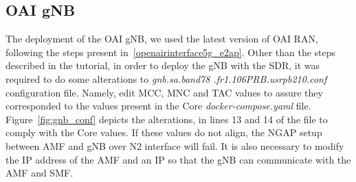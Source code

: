 \begin{table}[H]
    \caption{Deployed 5G Core Network Functions IP addresses.}
    \label{tab:ip_core}
    \centering
\end{table}

\begin{table}[H]
    \caption{Deployed Data Network Components IP addresses.}
    \label{tab:ip_dn}
    \centering
\end{table}





\subsection{OAI gNB}\label{subsec:oai-gnb}
The deployment of the OAI gNB, we used the latest version of OAI RAN, following the steps present in~\ref{openairinterface5g_e2ap}.
Other than the steps described in the tutorial, in order to deploy the gNB with the SDR, it was required to do some alterations to \textit{gnb.sa.band78
.fr1.106PRB.usrpb210.conf} configuration file.
Namely, edit MCC, MNC and TAC values to assure they corresponded to the values present in the Core \textit{docker-compose.yaml} file.
Figure~\ref{fig:gnb_conf} depicts the alterations, in lines 13 and 14 of the file to comply with the Core values.
If these values do not align, the NGAP setup between AMF and gNB over N2 interface will fail.
It is also necessary to modify the IP address of the AMF and an IP so that the gNB can communicate with the AMF and SMF\@.

